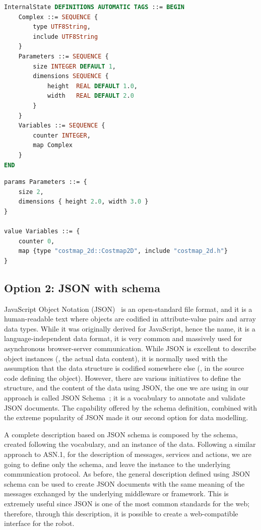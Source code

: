 \begin{lstlisting}[language=ASN1,caption={Internal state of a node modelled using ASN.1},label=lst:asn1-ros-is]
InternalState DEFINITIONS AUTOMATIC TAGS ::= BEGIN
	Complex ::= SEQUENCE {
		type UTF8String,
		include UTF8String
	}
	Parameters ::= SEQUENCE {
		size INTEGER DEFAULT 1,
		dimensions SEQUENCE {
			height	REAL DEFAULT 1.0,
			width	REAL DEFAULT 2.0
		}
	}
	Variables ::= SEQUENCE {
		counter INTEGER,
		map Complex
	}
END
\end{lstlisting}

\begin{lstlisting}[language=ASN1,caption={Internal state instance defined in ASN.1},label=lst:asn1-ros-is1]
params Parameters ::= {
	size 2, 
	dimensions { height 2.0, width 3.0 }
}

value Variables ::= { 
	counter 0,
	map {type "costmap_2d::Costmap2D", include "costmap_2d.h"}
}
\end{lstlisting}
 
\subsection{Option 2: JSON with schema}
 JavaScript Object Notation (JSON)~\cite{crockford2006application} is an open-standard file format, and it is a human-readable text where objects are codified in attribute-value pairs and array data types. While it was originally derived for JavaScript, hence the name, it is a language-independent data format, it is very common and massively used for asynchronous browser-server communication. While JSON is excellent to describe object instances (\ie, the actual data content), it is normally used with the assumption that the data structure is codified somewhere else (\eg, in the source code defining the object). However, there are various initiatives to define the structure, and the content of the data using JSON, the one we are using in our approach is called JSON Schema~\cite{pezoa2016foundations}; it is a vocabulary to annotate and validate JSON documents. The capability offered by the schema definition, combined with the extreme popularity of JSON made it our second option for data modelling.
 
A complete description based on JSON schema is composed by the schema, created following the vocabulary, and an instance of the data. Following a similar approach to ASN.1, for the description of messages, services and actions, we are going to define only the schema, and leave the instance to the underlying communication protocol. As before, the general description defined using JSON schema can be used to create JSON documents with the same meaning of the messages exchanged by the underlying middleware or framework. This is extremely useful since JSON is one of the most common standards for the web; therefore, through this description, it is possible to create a web-compatible interface for the robot. 

